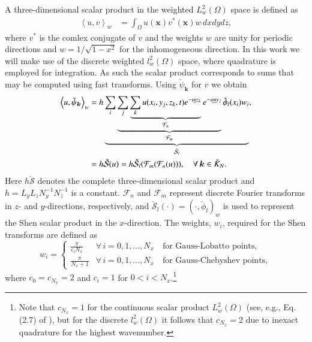 \documentclass[11pt, oneside]{elsarticle}
\newcommand{\N}[1]{\check{#1}}
\begin{document}
A three-dimensional scalar product in the weighted $L^2_w(\Omega)$ space is defined as
\begin{align}
 \left<u, v\right>_w &= \int_{\Omega} {u(\bm{x}) v^*(\bm{x})}w\,dxdydz, 
\end{align}
where $v^*$ is the comlex conjugate of $v$ and the weights $w$ are unity for 
periodic directions and  $w=1/\sqrt{1-x^2}$ for the inhomogeneous direction. In 
this work we will make use of the discrete weighted $l^2_w(\Omega)$ space, 
where quadrature is employed for integration. As such the scalar product 
corresponds to sums that may be computed using fast transforms. Using 
$\N{\psi}_{\bm{k}}$ for $v$ we obtain
\begin{align}
 \left< u, \N{\psi}_{\bm{k}} \right>_w &= h \underbrace{\sum_i 
 \underbrace{\sum_j \underbrace{\sum_k u(x_i, y_j, z_k, t)  e^{-\imath 
 \underline{n} z_k}}_{\mathcal{F}_n}  e^{-\imath \underline{m} y_j} 
 }_{\mathcal{F}_m} \N{\phi}_{l}(x_i) w_i}_{\N{\mathcal{S}}_l},   \notag \\
  &=  h \N{\mathcal{S}}(u) = h \N{\mathcal{S}}_{l} (\mathcal{F}_{{m}} 
  (\mathcal{F}_{{n}}(u))), \quad \forall \, \bm{k} \in \N{K}_N. \label{eq:sst1}
\end{align}
Here $h\N{\mathcal{S}}$ denotes the complete three-dimensional scalar product 
and $h = L_yL_zN_y^{-1}N_z^{-1}$ is a constant. $\mathcal{F}_{{n}}$ and 
$\mathcal{F}_{{m}}$ represent discrete Fourier transforms in $z$- and 
$y$-directions, respectively, and $\N{\mathcal{S}}_{l}(\cdot) = (\cdot, 
\N{\phi}_l)_w$ is used to represent the Shen scalar product in the 
$x$-direction. The weights, $w_i$, required for the Shen transforms are 
defined as
\begin{equation}
 w_i = \begin{cases}
       \frac{\pi}{c_i N_x} &\forall \, i=0,1,\ldots, N_x \quad  \text{for 
       Gauss-Lobatto points},\\
       \frac{\pi}{N_x+1} &\forall \, i=0,1,\ldots, N_x  \quad \text{for 
       Gauss-Chebyshev points},      
 \end{cases}
\end{equation}
where $c_0 = c_{N_x} = 2$ and $c_i = 1$ for $0 < i < N_x$.\footnote{Note that 
$c_{N_x}=1$ for the continuous scalar product $L^2_w(\Omega)$ (see, e.g., Eq. 
(2.7) of \cite{Shen95}), but for the discrete $l^2_w(\Omega)$ it follows that 
$c_{N_x}=2$ due to inexact quadrature for the highest wavenumber.}
\end{document}
